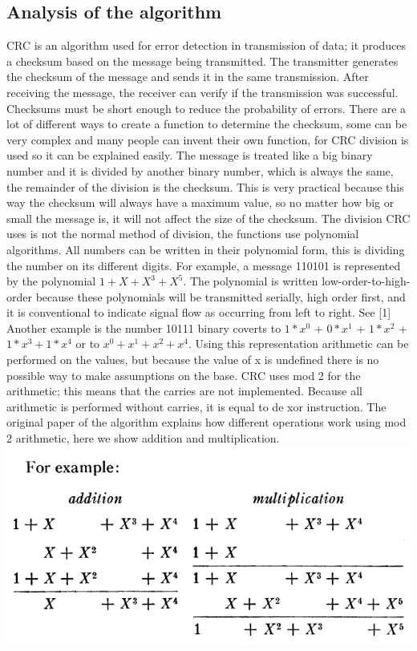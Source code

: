 \documentclass[10pt,twocolumn,letterpaper]{article}
\begin{document}
\subsection{Analysis of the algorithm}
CRC is an algorithm used for error detection in transmission of data; it produces a checksum based on the message being transmitted. The transmitter generates the checksum of the message and sends it in the same transmission. After receiving the message, the receiver can verify if the transmission was successful. Checksums must be short enough to reduce the probability of errors.
There are a lot of different ways to create a function to determine the checksum, some can be very complex and many people can invent their own function, for CRC division is used so it can be explained easily. The message is treated like a big binary number and it is divided by another binary number, which is always the same, the remainder of the division is the checksum. This is very practical because this way the checksum will always have a maximum value, so no matter how big or small the message is, it will not affect the size of the checksum.
The division CRC uses is not the normal method of division, the functions use polynomial algorithms. All numbers can be written in their polynomial form, this is dividing the number on its different digits.
For example, a message 110101 is represented by the polynomial $1 +X+X^3+X^5$. The polynomial is written low-order-to-high-order because these polynomials will be transmitted serially, high order first, and it is conventional to indicate signal flow as occurring from left to right. See [1]
Another example is the number 10111 binary coverts to $1*x^0$ + $0*x^1$ + $1*x^2$ + $1*x^3 +1*x^4$ or to $x^0 + x^1 + x^2 + x^4$. Using this representation arithmetic can be performed on the values, but because the value of x is undefined there is no possible way to make assumptions on the base. 
CRC uses mod 2 for the arithmetic; this means that the carries are not implemented. Because all arithmetic is performed without carries, it is equal to de xor instruction.
The original paper of the algorithm explains how different operations work using mod 2 arithmetic, here we show addition and multiplication. 
\includegraphics[scale=0.35]{imagenpp.png} 
\end{document}
